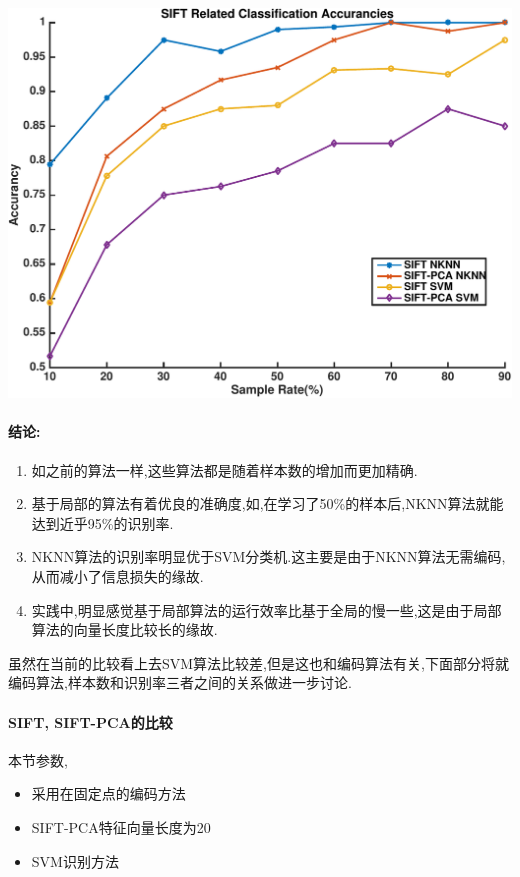 		\begin{center}
		\begin{minipage}[t]{\linewidth}
		\center
		{
		\includegraphics[width=\MyFactor\textwidth]{Img/c3/sift_classification} 
		}
		\end{minipage}
		\medskip
		\end{center}
		
\paragraph{结论:}
\begin{enumerate}
	\item 如之前的算法一样,这些算法都是随着样本数的增加而更加精确.
	\item 基于局部的算法有着优良的准确度,如,在学习了50\%的样本后,NKNN算法就能达到近乎95\%的识别率.
	\item NKNN算法的识别率明显优于SVM分类机.这主要是由于NKNN算法无需编码,从而减小了信息损失的缘故.
	\item 实践中,明显感觉基于局部算法的运行效率比基于全局的慢一些,这是由于局部算法的向量长度比较长的缘故.
\end{enumerate}

虽然在当前的比较看上去SVM算法比较差,但是这也和编码算法有关,下面部分将就编码算法,样本数和识别率三者之间的关系做进一步讨论.

\paragraph{SIFT, SIFT-PCA的比较}本节参数,
\begin{itemize}
	\item 采用在固定点的编码方法
	\item SIFT-PCA特征向量长度为20
	\item SVM识别方法
\end{itemize}

